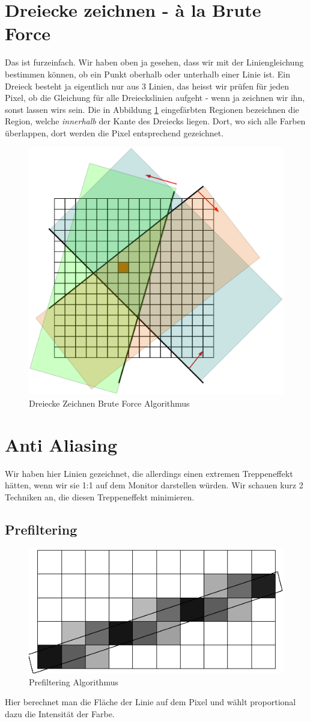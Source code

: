 \section{Dreiecke zeichnen - à la Brute Force}
Das ist furzeinfach. Wir haben oben ja gesehen, dass wir mit der Liniengleichung bestimmen können, ob ein Punkt oberhalb oder unterhalb einer Linie ist. Ein Dreieck besteht ja eigentlich nur aus 3 Linien, das heisst wir prüfen für jeden Pixel, ob die Gleichung für alle Dreieckslinien aufgeht - wenn ja zeichnen wir ihn, sonst lassen wirs sein. Die in Abbildung \ref{dreiecke_zeichnen} eingefärbten Regionen bezeichnen die Region, welche \textit{innerhalb} der Kante des Dreiecks liegen. Dort, wo sich alle Farben überlappen, dort werden die Pixel entsprechend gezeichnet.
\begin{figure}[!ht]
	\centering
	\includegraphics[width=0.5\linewidth]{fig/dreiecke_zeichnen}
	\caption{Dreiecke Zeichnen Brute Force Algorithmus}
	\label{dreiecke_zeichnen}
\end{figure}
\section{Anti Aliasing}
Wir haben hier Linien gezeichnet, die allerdings einen extremen Treppeneffekt hätten, wenn wir sie 1:1 auf dem Monitor darstellen würden. Wir schauen kurz 2 Techniken an, die diesen Treppeneffekt minimieren.
\subsection{Prefiltering}
\begin{figure}[!ht]
	\centering
	\includegraphics[width=0.5\linewidth]{fig/prefiltering}
	\caption{Prefiltering Algorithmus}
	\label{prefiltering}
\end{figure}
Hier berechnet man die Fläche der Linie auf dem Pixel und wählt proportional dazu die Intensität der Farbe. 
